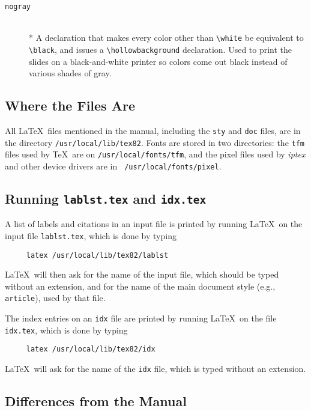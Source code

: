 \begin{description}
\item[{\tt \bs nogray}] \mbox{}\\*
A declaration that makes every color other than
\verb+\white+ be equivalent to \verb+\black+, and issues a
\verb+\hollowbackground+ declaration.  Used to print the slides on a
black-and-white printer so colors come out black instead of various
shades of gray.
\end{description}

\subsection{Where the Files Are}

%

All \LaTeX\ files mentioned in the manual, including the {\tt sty} and
{\tt doc} files, are in the directory \mbox{\tt /usr/local/lib/tex82}.
Fonts are stored in two directories: the {\tt tfm} files used by \TeX\
are on \mbox{\tt /usr/local/fonts/tfm}, and the pixel files used by
{\em iptex\/} and other device drivers are in \mbox{\tt
/usr/local/fonts/pixel}.

\subsection{Running {\tt lablst.tex} and {\tt idx.tex}}

A list of labels and citations in an input file is printed
by running \LaTeX\ on the input file \mbox{\tt lablst.tex},
which is done by typing
\begin{verbatim}
     latex /usr/local/lib/tex82/lablst
\end{verbatim}
\LaTeX\ will then ask for the name of the input file, which should be
typed without an extension, and for the name of the main document style
(e.g., \mbox{\tt article}), used by that file.

The index entries on an {\tt idx} file are printed by running \LaTeX\
on the file \mbox{\tt idx.tex}, which is done by typing
\begin{verbatim}
     latex /usr/local/lib/tex82/idx
\end{verbatim}
\LaTeX\ will ask for the name of the {\tt idx} file, which is typed
without an extension.



\subsection{Differences from the Manual}

